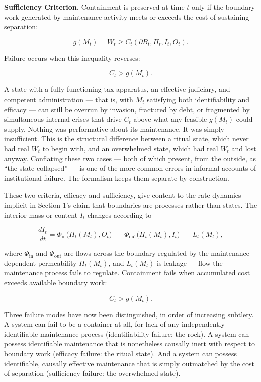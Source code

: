 \documentclass[11pt]{article}
\theoremstyle{plain}
\begin{document}
\textbf{Sufficiency Criterion.} Containment is preserved at time \(t\) only if the boundary work generated by maintenance activity meets or exceeds the cost of sustaining separation:

\[g(M_t) = W_t \geq C_t(\partial B_t, \Pi_t, I_t, O_t).\]

Failure occurs when this inequality reverses:

\[C_t > g(M_t).\]

A state with a fully functioning tax apparatus, an effective judiciary, and competent administration --- that is, with \(M_t\) satisfying both identifiability and efficacy --- can still be overrun by invasion, fractured by debt, or fragmented by simultaneous internal crises that drive \(C_t\) above what any feasible \(g(M_t)\) could supply. Nothing was performative about its maintenance. It was simply insufficient. This is the structural difference between a ritual state, which never had real \(W_t\) to begin with, and an overwhelmed state, which had real \(W_t\) and lost anyway. Conflating these two cases --- both of which present, from the outside, as ``the state collapsed'' --- is one of the more common errors in informal accounts of institutional failure. The formalism keeps them separate by construction.

These two criteria, efficacy and sufficiency, give content to the rate dynamics implicit in Section 1's claim that boundaries are processes rather than states. The interior mass or content \(I_t\) changes according to

\[\frac{dI_t}{dt} = \Phi_{\mathrm{in}}\big(\Pi_t(M_t), O_t\big) \;-\; \Phi_{\mathrm{out}}\big(\Pi_t(M_t), I_t\big) \;-\; L_t(M_t),\]

where \(\Phi_{\mathrm{in}}\) and \(\Phi_{\mathrm{out}}\) are flows across the boundary regulated by the maintenance-dependent permeability \(\Pi_t(M_t)\), and \(L_t(M_t)\) is leakage --- flow the maintenance process fails to regulate. Containment fails when accumulated cost exceeds available boundary work:

\[C_t > g(M_t).\]

Three failure modes have now been distinguished, in order of increasing subtlety. A system can fail to be a container at all, for lack of any independently identifiable maintenance process (identifiability failure: the rock). A system can possess identifiable maintenance that is nonetheless causally inert with respect to boundary work (efficacy failure: the ritual state). And a system can possess identifiable, causally effective maintenance that is simply outmatched by the cost of separation (sufficiency failure: the overwhelmed state).
\end{document}
